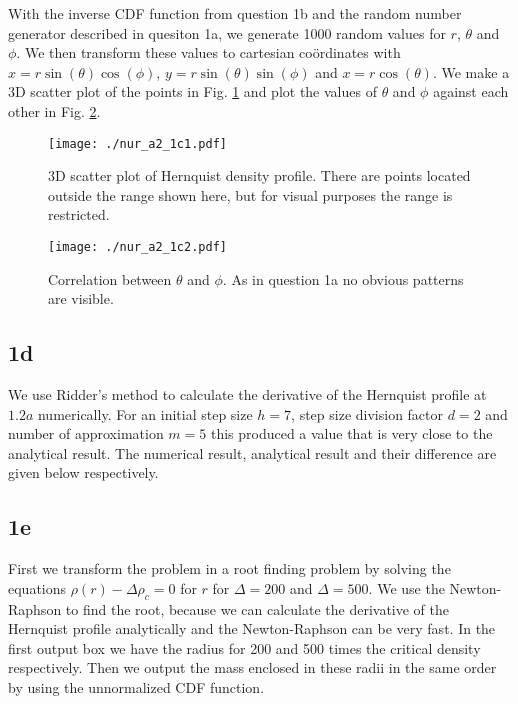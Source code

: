 

With the inverse CDF function from question 1b and the random number generator described in quesiton 1a, we generate 1000 random values for $r$, $\theta$ and $\phi$. We then transform these values to cartesian co\"ordinates with $x = r \sin(\theta) \cos(\phi)$, $y = r \sin(\theta) \sin(\phi)$ and $x = r \cos(\theta)$. We make a 3D scatter plot of the points in Fig. \ref{fig:1c1} and plot the values of $\theta$ and $\phi$ against each other in Fig. \ref{fig:1c2}.

\newpage

\begin{figure}[!ht]
  \centering
  \texttt{[image: ./nur\_a2\_1c1.pdf]}
  \caption{3D scatter plot of Hernquist density profile. There are points located outside the range shown here, but for visual purposes the range is restricted.}
  \label{fig:1c1}
\end{figure}

\begin{figure}[!ht]
  \centering
  \texttt{[image: ./nur\_a2\_1c2.pdf]}
  \caption{Correlation between $\theta$ and $\phi$. As in question 1a no obvious patterns are visible.}
  \label{fig:1c2}
\end{figure}

\newpage

\subsection{1d}



We use Ridder's method to calculate the derivative of the Hernquist profile at $1.2a$ numerically. For an initial step size $h = 7$, step size division factor $d = 2$ and number of approximation $m = 5$ this produced a value that is very close to the analytical result. The numerical result, analytical result and their difference are given below respectively.



\subsection{1e}



First we transform the problem in a root finding problem by solving the equations $\rho(r) - \Delta \rho_{c} = 0$ for $r$ for $\Delta = 200$ and $\Delta = 500$. We use the Newton-Raphson to find the root, because we can calculate the derivative of the Hernquist profile analytically and the Newton-Raphson can be very fast. In the first output box we have the radius for 200 and 500 times the critical density respectively. Then we output the mass enclosed in these radii in the same order by using the unnormalized CDF function.  

